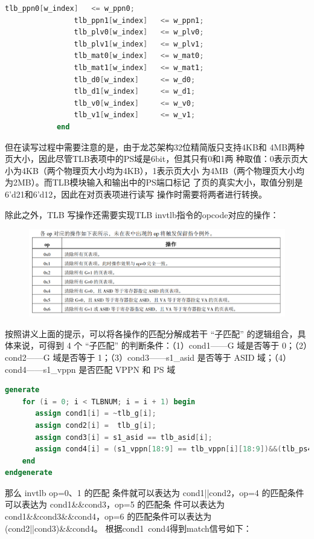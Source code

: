 \documentclass[11pt]{article}
\begin{document}
\begin{enumerate}
\begin{lstlisting}[language=verilog]
                tlb_ppn0[w_index]   <= w_ppn0;
                tlb_ppn1[w_index]   <= w_ppn1;
                tlb_plv0[w_index]   <= w_plv0;
                tlb_plv1[w_index]   <= w_plv1;
                tlb_mat0[w_index]   <= w_mat0;
                tlb_mat1[w_index]   <= w_mat1;
                tlb_d0[w_index]     <= w_d0;
                tlb_d1[w_index]     <= w_d1;
                tlb_v0[w_index]     <= w_v0;
                tlb_v1[w_index]     <= w_v1;
            end
  \end{lstlisting}
  但在读写过程中需要注意的是，由于龙芯架构32位精简版只支持4KB和
  4MB两种页大小，因此尽管TLB表项中的PS域是6bit，但其只有0和1两
  种取值：0表示页大小为4KB（两个物理页大小均为4KB），1表示页大小
  为4MB（两个物理页大小均为2MB）。而TLB模块输入和输出中的PS端口标记
  了页的真实大小，取值分别是6’d21和6’d12，因此在对页表项进行读写
  操作时需要将两者进行转换。\par
  除此之外，TLB 写操作还需要实现TLB invtlb指令的opcode对应的操作：
  \begin{figure}[H]
    \centering
    \includegraphics[width=13cm]{fig/2.png}
  \end{figure}
  按照讲义上面的提示，可以将各操作的匹配分解成若干 “子匹配” 的逻辑组合，具体来说，可得到 4 个 “子匹配”
  的判断条件：（1）cond1——G 域是否等于 0；（2）cond2——G 域是否等于 1；（3）cond3——s1_asid
  是否等于 ASID 域；（4）cond4——s1_vppn 是否匹配 VPPN 和 PS 域
  \begin{lstlisting}[language=verilog]
    generate
    for (i = 0; i < TLBNUM; i = i + 1) begin
       assign cond1[i] = ~tlb_g[i];
       assign cond2[i] =  tlb_g[i];
       assign cond3[i] = s1_asid == tlb_asid[i];
       assign cond4[i] = (s1_vppn[18:9] == tlb_vppn[i][18:9])&&(tlb_ps4MB[i]||(s1_vppn[8:0] == tlb_vppn[i][8:0]));
    end
endgenerate
  \end{lstlisting}
  那么 invtlb op=0、1 的匹配
  条件就可以表达为 cond1||cond2，op=4 的匹配条件可以表达为 cond1\&\&cond3，op=5 的匹配条
  件可以表达为 cond1\&\&cond3\&\&cond4，op=6 的匹配条件可以表达为 (cond2||cond3)\&\&cond4。
  根据cond1~cond4得到match信号如下：
  \begin{lstlisting}[language=verilog]

\end{lstlisting}
\end{enumerate}
\end{document}
